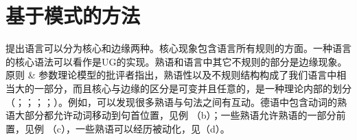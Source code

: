 \section{基于模式的方法}
\label{Abschnitt-musterbasiert}

\mbox{} \citet[--8]{Chomsky81a}提出语言可以分为核心和边缘两种。核心现象包含语言所有规则的方面。一种语言的核心语法可以看作是UG的实现。熟语和语言中其它不规则的部分是边缘现象。原则 \& 参数理论模型的批评者指出，熟语性以及不规则结构构成了我们语言中相当大的一部分，而且核心与边缘的区分是可变并且任意的，是一种理论内部的划分（\citealp[\S~7]{Jackendoff97a}；\citealp{Culicover99a-u}；\citealp[]{GSag2000a-u}；\citealp[]{Newmeyer2005a}；\citealp[]{Kuhn2007a}）。例如，可以发现很多熟语与句法之间有互动\citep*{NSW94a}。德语中包含动词的熟语大部分都允许动词移动到句首位置，见例 （b）；一些熟语允许熟语的一部分前置，见例 （c），一些熟语可以经历被动化，见（d）。

